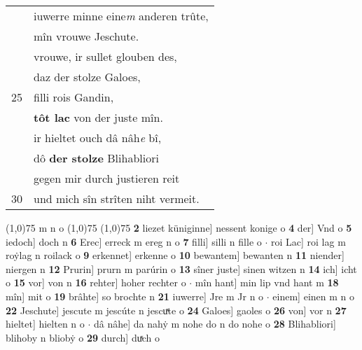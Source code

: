 \documentclass[8pt,a4paper,notitlepage]{article}
\begin{document}
\begin{table}[ht]
\begin{minipage}[t]{0.5\linewidth}
\begin{tabular}{rl}
 & iuwerre minne eine\textit{m} anderen trûte,\\ 
 & mîn vrouwe Jeschute.\\ 
 & vrouwe, ir sullet glouben des,\\ 
 & daz der stolze Galoes,\\ 
25 & filli rois Gandin,\\ 
 & \textbf{tôt lac} von der juste mîn.\\ 
 & ir hieltet ouch dâ nâh\textit{e} bî,\\ 
 & dô \textbf{der stolze} Blihabliori\\ 
 & gegen mir durch justieren reit\\ 
30 & und mich sîn strîten niht vermeit.\\ 
\end{tabular}
\scriptsize
\line(1,0){75} \newline
m n o \newline
\line(1,0){75} \newline
\newline
\line(1,0){75} \newline
\textbf{2} liezet küniginne] nessent konige o \textbf{4} der] Vnd o \textbf{5} iedoch] doch n \textbf{6} Erec] erreck m ereg n o \textbf{7} filli] silli n fille o  $\cdot$ roi Lac] roi lag m roẏlag n roilack o \textbf{9} erkennet] erkenne o \textbf{10} bewantem] bewanten n \textbf{11} niender] niergen n \textbf{12} Prurin] prurn m parúrin o \textbf{13} sîner juste] sinen witzen n \textbf{14} ich] icht o \textbf{15} vor] von n \textbf{16} rehter] hoher rechter o  $\cdot$ mîn hant] min lip vnd hant m \textbf{18} mîn] mit o \textbf{19} brâhte] so brochte n \textbf{21} iuwerre] Jre m Jr n o  $\cdot$ einem] einen m n o \textbf{22} Jeschute] jescute m jescúte n jescuͯte o \textbf{24} Galoes] gaoles o \textbf{26} von] vor n \textbf{27} hieltet] hielten n o  $\cdot$ dâ nâhe] da nahẏ m nohe do n do nohe o \textbf{28} Blihabliori] blihoby n bliobẏ o \textbf{29} durch] duͯch o \newline
\end{minipage}
\end{table}
\newpage
\end{document}
